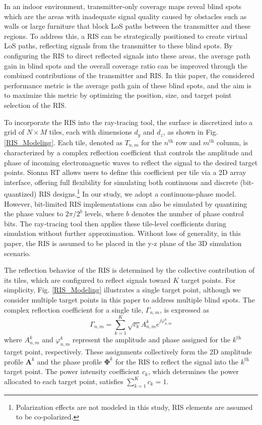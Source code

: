\documentclass{IEEEoj}
\begin{document}
In an indoor environment, transmitter-only coverage maps reveal blind spots which are the areas with inadequate signal quality caused by obstacles such as walls or large furniture that block LoS paths between the transmitter and these regions. To address this, a RIS can be strategically positioned to create virtual LoS paths, reflecting signals from the transmitter to these blind spots. By configuring the RIS to direct reflected signals into these areas, the average path gain in blind spots and the overall coverage ratio can be improved through the combined contributions of the transmitter and RIS. In this paper, the considered performance metric is the average path gain of these blind spots, and the aim is to maximize this metric by optimizing the position, size, and target point selection of the RIS.

To incorporate the RIS into the ray-tracing tool, the surface is discretized into a grid of $N \times M$ tiles, each with dimensions $d_y$ and $d_z$, as shown in Fig. \ref{RIS_Modeling}. Each tile, denoted as $T_{n,m}$ for the $n^{\text{th}}$ row and $m^{\text{th}}$ column, is characterized by a complex reflection coefficient that controls the amplitude and phase of incoming electromagnetic waves to reflect the signal to the desired target points. Sionna RT allows users to define this coefficient per tile via a 2D array interface, offering full flexibility for simulating both continuous and discrete (bit-quantized) RIS designs.\footnote{Polarization effects are not modeled in this study, RIS elements are assumed to be co-polarized.} In our study, we adopt a continuous-phase model. However, bit-limited RIS implementations can also be simulated by quantizing the phase values to $2\pi/2^b$ levels, where $b$ denotes the number of phase control bits. The ray-tracing tool then applies these tile-level coefficients during simulation without further approximation. Without loss of generality, in this paper, the RIS is assumed to be placed in the y-z plane of the 3D simulation scenario.

The reflection behavior of the RIS is determined by the collective contribution of its tiles, which are configured to reflect signals toward $K$ target points. For simplicity, Fig. \ref{RIS_Modeling} illustrates a single target point, although we consider multiple target points in this paper to address multiple blind spots. The complex reflection coefficient for a single tile, $\Gamma_{n,m}$, is expressed as
\begin{equation} \label{ref_coef_exp}
	\Gamma_{n,m} = \sum \limits_{k=1}^K \sqrt{c_k} A_{n,m}^k e^{j \varphi_{n,m}^k}
\end{equation}
where $A_{n,m}^k$ and $\varphi_{n,m}^k$ represent the amplitude and phase assigned for the $k^{\text{th}}$ target point, respectively. These assignments collectively form the 2D amplitude profile $\mathbf{A}^k$ and the phase profile $\mathbf{\Phi}^k$ for the RIS to reflect the signal into the $k^{\text{th}}$ target point. The power intensity coefficient $c_k$, which determines the power allocated to each target point, satisfies $\sum_{k=1}^K c_k = 1$.
\end{document}
